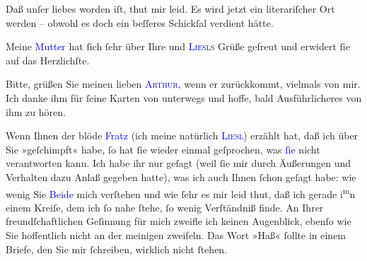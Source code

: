 \pstart
           Daß unſer liebes \label{K_L03532-3v}\label{K_L03532-3h} worden iſt,
               thut mir leid. Es wird jetzt ein literariſcher Ort werden – obwohl es doch ein beſſeres Schickſal verdient hätte.\pend
           
\pstart
           Meine \textcolor{blue}{Mutter}{}\ledrightnote{{$\rightarrow$}\textcolor{blue}{Clementine Goldmann}} hat ſich ſehr
               über Ihre und \textsc{\textcolor{blue}{Liesl}{}\ledrightnote{\textcolor{blue}{Elisabeth Steinrück}}s} Grüße gefreut und erwidert ſie
               auf das Herzlichſte.\pend
           
\pstart
           Bitte, grüßen Sie meinen lieben \textsc{\textcolor{blue}{Arthur}{}\ledrightnote{}}, wenn er \label{K_L03532-4v}\label{K_L03532-4h} zurückkommt, vielmals von mir.
               Ich \strikeout{\textcolor{gray}{bed}} danke ihm für ſeine Karten von unterwegs und hoffe, bald Ausführlicheres von
               ihm zu hören.\pend
           
\pstart
           Wenn Ihnen der blöde \textcolor{blue}{Fratz}{}\ledrightnote{{$\rightarrow$}\textcolor{blue}{Elisabeth Steinrück}}
               (ich meine natürlich \textsc{\textcolor{blue}{Liesl}{}\ledrightnote{\textcolor{blue}{Elisabeth Steinrück}}}) erzählt hat, daß ich über Sie »geſchimpft« habe, ſo hat ſie wieder einmal {\pb}geſprochen, was \textcolor{blue}{ſie}{}\ledrightnote{{$\rightarrow$}\textcolor{blue}{Elisabeth Steinrück}} nicht verantworten kann. Ich habe ihr nur geſagt (weil ſie
               mir durch Äußerungen und Verhalten dazu Anlaß gegeben hatte), was ich auch Ihnen
               ſchon geſagt habe: wie wenig Sie \textcolor{blue}{Beide}{}\ledrightnote{{$\rightarrow$}\textcolor{blue}{Elisabeth Steinrück}} mich verſtehen und wie ſehr es 
               mir leid thut, daß ich gerade i\substVorne{}\textsuperscript{m}\substDazwischen{}n\substHinten{} einem Kreiſe, dem ich ſo nahe ſtehe, ſo wenig Verſtändniß finde. An Ihrer
               freundſchaftlichen Geſinnung für mich zweifle ich keinen Augenblick, ebenſo wie Sie
               hoffentlich nicht an der meinigen zweifeln. Das Wort »Haß« ſollte in einem Briefe,
               den Sie mir ſchreiben, wirklich nicht ſtehen.\pend
           
